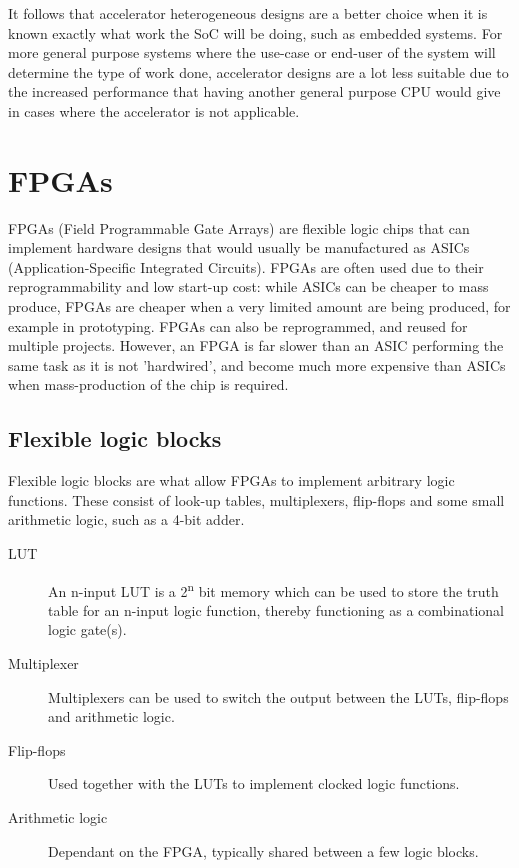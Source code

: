 It follows that accelerator heterogeneous designs are a better choice when it is known exactly what work the SoC will be doing, such as embedded systems. For more general purpose systems where the use-case or end-user of the system will determine the type of work done, accelerator designs are a lot less suitable due to the increased performance that having another general purpose CPU would give in cases where the accelerator is not applicable.

\section{FPGAs}
FPGAs (Field Programmable Gate Arrays) are flexible logic chips that can implement hardware designs that would usually be manufactured as ASICs (Application-Specific Integrated Circuits). FPGAs are often used due to their reprogrammability and low start-up cost: while ASICs can be cheaper to mass produce, FPGAs are cheaper when a very limited amount are being produced, for example in prototyping. FPGAs can also be reprogrammed, and reused for multiple projects. However, an FPGA is far slower than an ASIC performing the same task as it is not 'hardwired', and become much more expensive than ASICs when mass-production of the chip is required.

\subsection{Flexible logic blocks}
Flexible logic blocks are what allow FPGAs to implement arbitrary logic functions. These consist of look-up tables, multiplexers, flip-flops and some small arithmetic logic, such as a 4-bit adder.

\begin{description}
    \item[LUT] An n-input LUT is a 2\textsuperscript{n} bit memory which can be used to store the truth table for an n-input logic function, thereby functioning as a combinational logic gate(s).
    \item[Multiplexer] Multiplexers can be used to switch the output between the LUTs, flip-flops and arithmetic logic.
    \item[Flip-flops] Used together with the LUTs to implement clocked logic functions.
    \item[Arithmetic logic] Dependant on the FPGA, typically shared between a few logic blocks.
\end{description}

